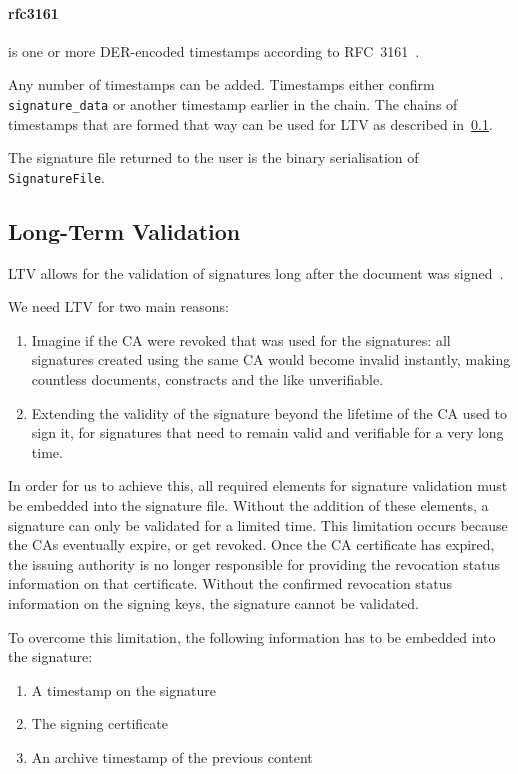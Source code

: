 \paragraph{rfc3161} is one or more \gls{DER}-encoded timestamps according to RFC~3161~\cite{rfc3161}.

Any number of timestamps can be added.
Timestamps either confirm \texttt{signature\_data} or another timestamp earlier in the chain.
The chains of timestamps that are formed that way can be used for \gls{LTV} as described in~\ref{subsec:long-term-validation}.

The signature file returned to the user is the binary serialisation of \texttt{SignatureFile}.


\subsection{Long-Term Validation}\label{subsec:long-term-validation}
\glsdesc{LTV} allows for the validation of signatures long after the document was signed~\cite{etsipades}.

We need \gls{LTV} for two main reasons:
\begin{enumerate}
    \item Imagine if the \gls{CA} were revoked that was used for the signatures: all signatures created using the same \gls{CA} would become invalid instantly, making countless documents, constracts and the like unverifiable.
    \item Extending the validity of the signature beyond the lifetime of the \gls{CA} used to sign it, for signatures that need to remain valid and verifiable for a very long time.
\end{enumerate}
In order for us to achieve this, all required elements for signature validation must be embedded into the signature file.
Without the addition of these elements, a signature can only be validated for a limited time.
This limitation occurs because the \gls{CA}s eventually expire, or get revoked.
Once the \gls{CA} certificate has expired, the issuing authority is no longer responsible for providing the revocation status information on that certificate.
Without the confirmed revocation status information on the signing keys, the signature cannot be validated.

To overcome this limitation, the following information has to be embedded into the signature:
\begin{enumerate}
    \item A timestamp on the signature
    \item The signing certificate
    \item An archive timestamp of the previous content
\end{enumerate}

